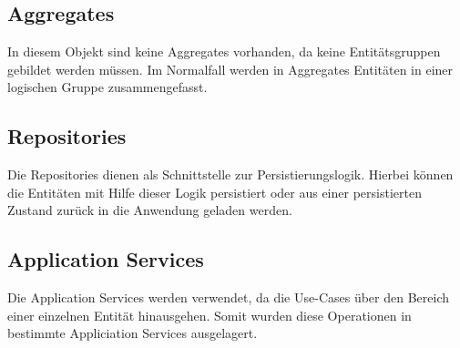         \subsection{Aggregates}
        In diesem Objekt sind keine Aggregates vorhanden, da keine Entitätsgruppen gebildet werden müssen. Im Normalfall werden in Aggregates Entitäten in einer logischen Gruppe zusammengefasst.

        \subsection{Repositories}
        Die Repositories dienen als Schnittstelle zur Persistierungslogik. Hierbei können die Entitäten mit Hilfe dieser Logik persistiert oder aus einer persistierten Zustand zurück in die Anwendung geladen werden.
        
        \subsection{Application Services}
        Die Application Services werden verwendet, da die Use-Cases über den Bereich einer einzelnen Entität hinausgehen. Somit wurden diese Operationen in bestimmte Appliciation Services ausgelagert.